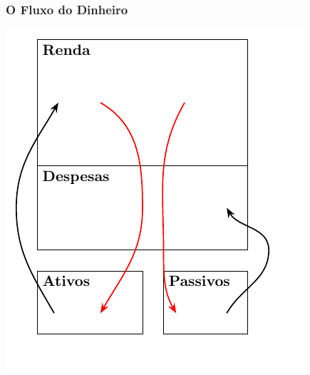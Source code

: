 \begin{frame}[c]\frametitle{O Fluxo do Dinheiro}
  \begin{center}
    \includegraphics{../figuras/pai_rico}
  \end{center}
\end{frame}

